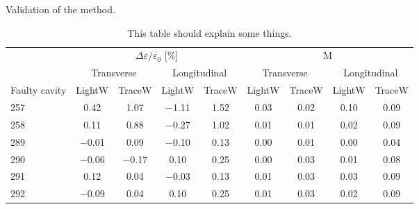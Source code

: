 \begin{frame}[t]
\begin{columns}[t]
\begin{column}{\colwidth}
         \begin{block}{Validation of the method.}
            \begin{table}
               \caption{%
                  This table should explain some things.
               }
               \label{tab:optics}
               \begin{center}
                  \begin{tabular}{@{} l c c c c c c c c @{}}
                     \toprule
                     & \multicolumn{4}{c}{$\Delta\varepsilon/\varepsilon_0$ [\si{\percent}]}     & \multicolumn{4}{c}{M} \\
                     \cmidrule(l){2-5}         \cmidrule(r){6-9}         
                     & \multicolumn{2}{c}{Transverse} &\multicolumn{2}{c}{Longitudinal} &\multicolumn{2}{c}{Transverse} &\multicolumn{2}{c}{Longitudinal} \\
                     \cmidrule(l){2-3}\cmidrule(rl){4-5}\cmidrule(rl){6-7}\cmidrule(r){8-9}
                     Faulty cavity & LightW  & TraceW       & LightW    & TraceW    & LightW & TraceW         & LightW  & TraceW                    \\
                     \midrule                                                                                                                                   
                     257  & \num{ 0.42}         &\num{1.07}        & \num{-1.11} &  \num{1.52} & \alert{\num{0.03}} & \alert{\num{0.02}} & \alert{\num{0.10}}& \alert{\num{0.09}}  \\
                     258  & \num{ 0.11}         &\num{0.88}        & \num{-0.27} &  \num{1.02} & \num{0.01} & \num{0.01}         & \num{0.02}& \num{0.09}                   \\
                     289  & \num{-0.01}         &\num{0.09}        & \num{-0.10} &  \num{0.13} & \num{0.00} & \num{0.01}         & \num{0.00}& \num{0.04}                   \\
                     290  & \num{-0.06}         &\num{-0.17}       & \num{ 0.10} &  \num{0.25} & \num{0.00} & \num{0.03}         & \num{0.01}& \num{0.08}                   \\
                     291  & \alert{\num{ 0.12}} &\alert{\num{0.04}}& \num{-0.03} &  \num{0.13} & \num{0.01} & \num{0.03}         & \num{0.03}& \num{0.09}                   \\
                     292  & \alert{\num{-0.09}} &\alert{\num{0.04}}& \num{ 0.10} &  \num{0.25} & \num{0.01} & \num{0.03}         & \num{0.02}& \num{0.09}                   \\

\end{tabular}
\end{center}
\end{table}
\end{block}
\end{column}
\end{columns}
\end{frame}
